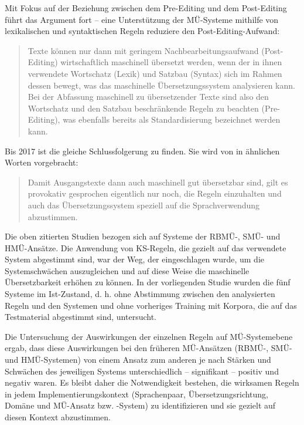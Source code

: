 Mit Fokus auf der Beziehung zwischen dem Pre-Editing und dem Post-Editing führt \citet[481]{Göpferich2007b} das Argument fort -- eine Unterstützung der MÜ-Systeme mithilfe von lexikalischen und syntaktischen Regeln reduziere den Post-Editing-Aufwand:
\begin{quote}
Texte können nur dann mit geringem Nachbearbeitungsaufwand (Post-Ed\-it\-ing) wirtschaftlich maschinell übersetzt werden, wenn der in ihnen verwendete Wortschatz (Lexik) und Satzbau (Syntax) sich im Rahmen dessen bewegt, was das maschinelle Übersetzungssystem analysieren kann. Bei der Abfassung maschinell zu übersetzender Texte sind also den Wortschatz und den Satzbau beschränkende Regeln zu beachten (Pre-Editing), was ebenfalls bereits als Standardisierung bezeichnet werden kann. \citep[481]{Göpferich2007b}
\end{quote}

Bis 2017 ist die gleiche Schlussfolgerung zu finden. Sie wird von \citet{Wittkowsky2017} in ähnlichen Worten vorgebracht:
\begin{quote}
Damit Ausgangstexte dann auch maschinell gut übersetzbar sind, gilt es provokativ gesprochen eigentlich nur noch, die Regeln einzuhalten und auch das Übersetzungssystem speziell auf die Sprachverwendung abzustimmen. \citep[93]{Wittkowsky2017}
\end{quote}

Die oben zitierten Studien bezogen sich auf Systeme der RBMÜ-, SMÜ- und HMÜ-Ansätze. Die Anwendung von KS-Regeln, die gezielt auf das verwendete System abgestimmt sind, war der Weg, der eingeschlagen wurde, um die Systemschwächen auszugleichen und auf diese Weise die maschinelle Übersetzbarkeit erhöhen zu können. In der vorliegenden Studie wurden die fünf Systeme im Ist-Zustand, d. h. ohne Abstimmung zwischen den analysierten Regeln und den Systemen und ohne vorheriges Training mit Korpora, die auf das Testmaterial abgestimmt sind, untersucht.

Die Untersuchung der Auswirkungen der einzelnen Regeln auf MÜ-Sys\-tem\-ebe\-ne ergab, dass diese Auswirkungen bei den früheren MÜ-Ansätzen (RBMÜ-, SMÜ- und HMÜ-Systemen) von einem Ansatz zum anderen je nach Stärken und Schwächen des jeweiligen Systems unterschiedlich -- signifikant -- positiv und negativ waren. Es bleibt daher die Notwendigkeit bestehen, die wirksamen Regeln in jedem Implementierungskontext (Sprachenpaar, Übersetzungsrichtung, Domäne und MÜ-Ansatz bzw. -System) zu identifizieren und sie gezielt auf diesen Kontext abzustimmen.

